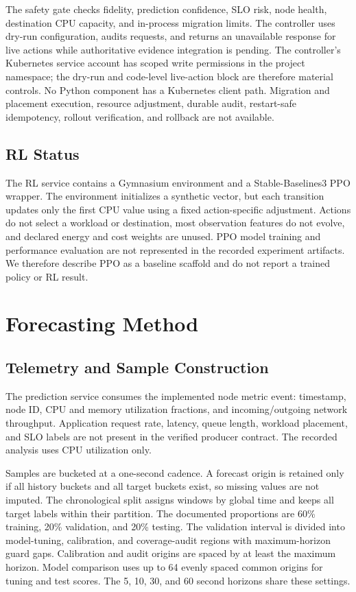 \documentclass[conference]{IEEEtran}
\begin{document}
The safety gate checks fidelity, prediction confidence, SLO risk, node health, destination CPU capacity, and in-process migration limits. The controller uses dry-run configuration, audits requests, and returns an unavailable response for live actions while authoritative evidence integration is pending. The controller's Kubernetes service account has scoped write permissions in the project namespace; the dry-run and code-level live-action block are therefore material controls. No Python component has a Kubernetes client path. Migration and placement execution, resource adjustment, durable audit, restart-safe idempotency, rollout verification, and rollback are not available.

\subsection{RL Status}
The RL service contains a Gymnasium environment and a Stable-Baselines3 PPO wrapper. The environment initializes a synthetic vector, but each transition updates only the first CPU value using a fixed action-specific adjustment. Actions do not select a workload or destination, most observation features do not evolve, and declared energy and cost weights are unused. PPO model training and performance evaluation are not represented in the recorded experiment artifacts. We therefore describe PPO as a baseline scaffold and do not report a trained policy or RL result.

\section{Forecasting Method}
\subsection{Telemetry and Sample Construction}
The prediction service consumes the implemented node metric event: timestamp, node ID, CPU and memory utilization fractions, and incoming/outgoing network throughput. Application request rate, latency, queue length, workload placement, and SLO labels are not present in the verified producer contract. The recorded analysis uses CPU utilization only.

Samples are bucketed at a one-second cadence. A forecast origin is retained only if all history buckets and all target buckets exist, so missing values are not imputed. The chronological split assigns windows by global time and keeps all target labels within their partition. The documented proportions are 60\% training, 20\% validation, and 20\% testing. The validation interval is divided into model-tuning, calibration, and coverage-audit regions with maximum-horizon guard gaps. Calibration and audit origins are spaced by at least the maximum horizon. Model comparison uses up to 64 evenly spaced common origins for tuning and test scores. The 5, 10, 30, and 60 second horizons share these settings.
\end{document}
